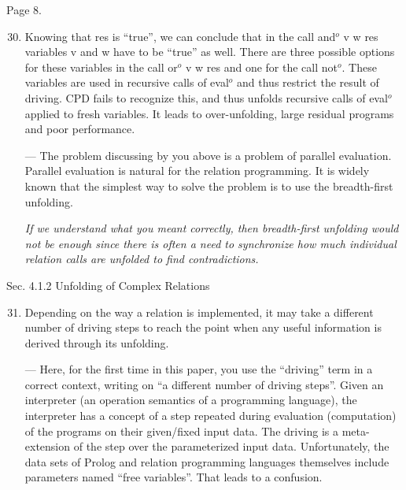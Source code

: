 Page 8.

\begin{enumerate}
  \setcounter{enumi}{29}
  \item {
  Knowing that res is ``true'', we can conclude that in the call and$^o$ v w res variables v and w have to be ``true'' as well. There are three possible options for these variables in the call or$^o$ v w res and one for the call not$^o$. These variables are used in recursive calls of eval$^o$ and thus restrict the result of driving. CPD fails to recognize this, and thus unfolds recursive calls of eval$^o$ applied to fresh variables. It leads to over-unfolding, large residual programs and poor performance.

  --- The problem discussing by you above is a problem of parallel evaluation. Parallel evaluation is natural for the relation programming. It is widely known that the simplest way to solve the problem is to use the breadth-first unfolding.

  \emph{If we understand what you meant correctly, then breadth-first unfolding would not be enough since there is often a need to synchronize how much individual relation calls are unfolded to find contradictions. }
  }

\end{enumerate}

Sec. 4.1.2 Unfolding of Complex Relations

\begin{enumerate}
  \setcounter{enumi}{30}
  \item Depending on the way a relation is implemented, it may take a different number of driving steps to reach the point when any useful information is derived through its unfolding.

  --- Here, for the first time in this paper, you use the ``driving'' term in a correct context, writing on ``a different number of driving steps''. Given an interpreter (an operation semantics of a programming language), the interpreter has a concept of a step repeated during evaluation (computation) of the programs on their given/fixed input data. The driving is a meta-extension of the step over the parameterized input data. Unfortunately, the data sets of Prolog and relation programming languages themselves include parameters named ``free variables''. That leads to a confusion.


\end{enumerate}

